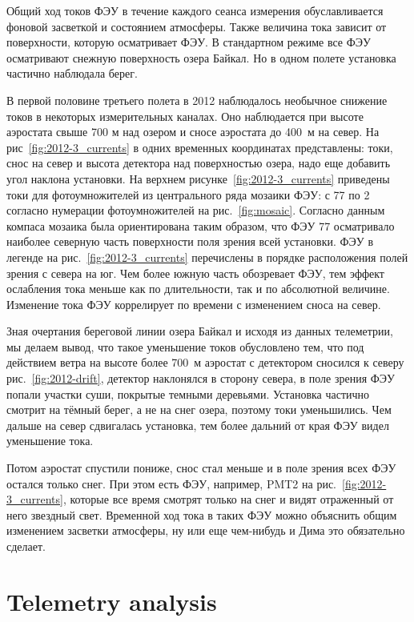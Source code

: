 \documentclass[final,5p,times,twocolumn]{elsarticle}
\begin{document}
{\Russian
Общий ход токов ФЭУ в течение каждого сеанса измерения обуславливается фоновой засветкой и состоянием атмосферы. Также величина тока зависит от поверхности, которую осматривает ФЭУ. В стандартном режиме все ФЭУ осматривают снежную поверхность озера Байкал. Но в одном полете установка частично наблюдала берег.

В первой половине третьего полета в 2012 наблюдалось необычное снижение токов в некоторых измерительных каналах. Оно наблюдается при высоте аэростата свыше 700 м над озером и сносе аэростата до 400~м на север. На рис~\ref{fig:2012-3_currents} в одних временных координатах представлены: токи, снос на север и высота детектора над поверхностью озера, надо еще добавить угол наклона установки. На верхнем рисунке~\ref{fig:2012-3_currents} приведены токи для фотоумножителей из центрального ряда мозаики ФЭУ: с 77 по 2 согласно нумерации фотоумножителей на рис.~\ref{fig:mosaic}. Согласно данным компаса мозаика была ориентирована таким образом, что ФЭУ 77 осматривало наиболее северную часть поверхности поля зрения всей установки. ФЭУ в легенде на рис.~\ref{fig:2012-3_currents} перечислены в порядке расположения полей зрения с севера на юг. Чем более южную часть обозревает ФЭУ, тем эффект ослабления тока меньше как по длительности, так и по абсолютной величине. Изменение тока ФЭУ коррелирует по времени с изменением сноса на север. 

Зная очертания береговой линии озера Байкал и исходя из данных телеметрии, мы делаем вывод, что такое уменьшение токов обусловлено тем, что под действием ветра на высоте более 700~м аэростат с детектором сносился к северу рис.~\ref{fig:2012-drift}, детектор наклонялся в сторону севера, в поле зрения ФЭУ попали участки суши, покрытые темными деревьями. Установка частично смотрит на тёмный берег, а не на снег озера, поэтому токи уменьшились. Чем дальше на север сдвигалась установка, тем более дальний от края ФЭУ видел уменьшение тока.  

Потом аэростат спустили пониже, снос стал меньше и в поле зрения всех ФЭУ остался только снег. 
При этом есть ФЭУ, например, PMT2 на рис.~\ref{fig:2012-3_currents}, которые все время смотрят только на снег и видят отраженный от него звездный свет. Временной ход тока в таких ФЭУ можно объяснить общим изменением засветки атмосферы, ну или еще чем-нибудь и Дима это обязательно сделает. 


}



\section{Telemetry analysis}
\end{document}
